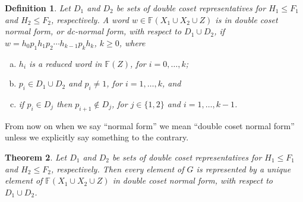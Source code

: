 \documentclass[a4paper,12pt]{article}
\newtheorem{theorem}{Theorem}[section]
\newtheorem{definition}[theorem]{Definition}
\numberwithin{equation}{section}
\numberwithin{figure}{section}
\newcommand{\FF}{\ensuremath{\mathbb{F}}}
\newcommand{\be}{\begin{enumerate}}
\newcommand{\ee}{\end{enumerate}}
\begin{document}
\begin{definition}\label{def:dcnf}
 Let $D_1$ and $D_2$ be sets of  double coset representatives for
$H_1\le F_1$ and $H_2\le F_2$, respectively.
A word $w\in \FF(X_1\cup X_2\cup Z)$ is in
\emph{double coset normal form}, or \emph{dc-normal form}, with
respect to $D_1\cup D_2$, if
$w = h_{0}p_1h_{1}p_2 \cdots h_{k-1}p_kh_{{k}}$, $k\ge 0$,   where 
\be[(a)]
\item $h_i$ is a reduced word in $\FF(Z)$, for $i=0,\ldots, k$;
\item  $p_i  \in D_1\cup D_2$ and $p_i\neq 1$, for $i=1,\ldots, k$,  and
\item if  $p_i\in D_j$ then $p_{i+1}\notin D_j$, for $j\in \{1,2\}$
and $i=1,\ldots ,k-1$.
\ee
\end{definition}
From now on when we say ``normal form'' we mean ``double coset normal form'' unless
we explicitly say something to the contrary.
\begin{theorem}\label{thm:dcnf} Let $D_1$ and $D_2$ be sets of  double coset representatives for
$H_1\le F_1$ and $H_2\le F_2$, respectively. 
Then every element of $G$ is represented by a unique element of
$\FF(X_1\cup X_2\cup Z)$ in double coset normal form, with respect
to $D_1\cup D_2$.
\end{theorem}
\end{document}
